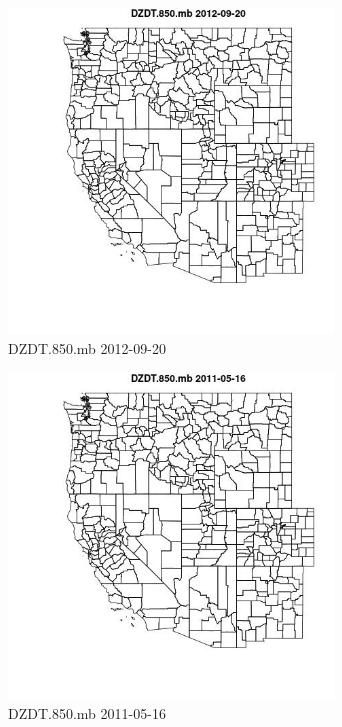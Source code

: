 \begin{figure} 
\centering  
\includegraphics[width=0.77\textwidth]{Code_Outputs/ML_input_report_ML_input_PM25_Step5_part_d_de_duplicated_aves_ML_input_MapObsDZDT850mb2012-09-20.jpg} 
\caption{\label{fig:ML_input_report_ML_input_PM25_Step5_part_d_de_duplicated_aves_ML_inputMapObsDZDT850mb2012-09-20}DZDT.850.mb 2012-09-20} 
\end{figure} 
 

\begin{figure} 
\centering  
\includegraphics[width=0.77\textwidth]{Code_Outputs/ML_input_report_ML_input_PM25_Step5_part_d_de_duplicated_aves_ML_input_MapObsDZDT850mb2011-05-16.jpg} 
\caption{\label{fig:ML_input_report_ML_input_PM25_Step5_part_d_de_duplicated_aves_ML_inputMapObsDZDT850mb2011-05-16}DZDT.850.mb 2011-05-16} 
\end{figure} 
 


